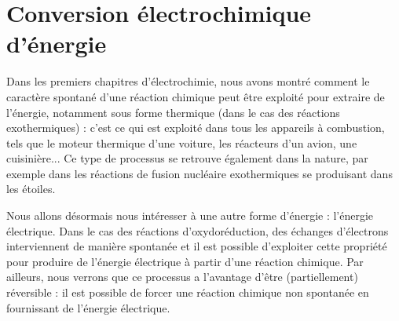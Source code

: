 \documentclass[11pt,fleqn]{book} %
\begin{document}










\setcounter{chapter}{13}

\chapter{Conversion électrochimique d'énergie}

Dans les premiers chapitres d'électrochimie, nous avons montré comment le caractère spontané d'une réaction chimique peut être exploité pour extraire de l'énergie, notamment sous forme thermique (dans le cas des réactions exothermiques) : c'est ce qui est exploité dans tous les appareils à combustion, tels que le moteur thermique d'une voiture, les réacteurs d'un avion, une cuisinière... Ce type de processus se retrouve également dans la nature, par exemple dans les réactions de fusion nucléaire exothermiques se produisant dans les étoiles.

Nous allons désormais nous intéresser à une autre forme d'énergie : l'énergie électrique. Dans le cas des réactions d'oxydoréduction, des échanges d'électrons interviennent de manière spontanée et il est possible d'exploiter cette propriété pour produire de l'énergie électrique à partir d'une réaction chimique. Par ailleurs, nous verrons que ce processus a l'avantage d'être (partiellement) réversible : il est possible de forcer une réaction chimique non spontanée en fournissant de l'énergie électrique.
\end{document}
